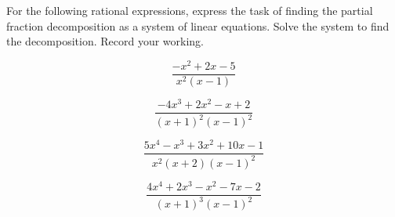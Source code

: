 \begin{exercise} \label{ex:} 
For the following rational expressions, express the task of finding the partial fraction decomposition as a system of linear equations.
Solve the system to find the decomposition.  
Record your working.
\begin{parts}
\item 
\begin{equation*}
\frac{-x^2+2x-5}{x^2(x-1)}
\end{equation*}

\item 
\begin{equation*}
\frac{-4x^3+2x^2-x+2}{(x+1)^2(x-1)^2}
\end{equation*}

\item 
\begin{equation*}
\frac{5x^4-x^3+3x^2+10x-1}{x^2(x+2)(x-1)^2}
\end{equation*}


\item 
\begin{equation*}
\frac{4x^4+2x^3-x^2-7x-2}{(x+1)^3(x-1)^2}
\end{equation*}

\end{parts}
\end{exercise}





